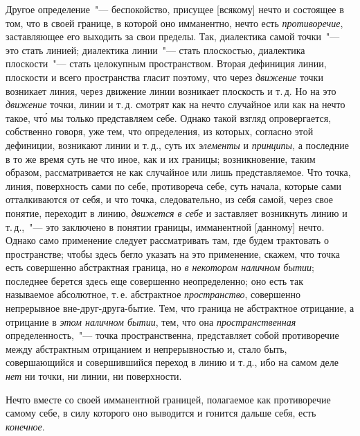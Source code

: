 Другое определение~"--- беспокойство, присущее [всякому]
нечто и состоящее в том, что в своей границе, в
которой оно имманентно, нечто есть \emph{противоречие}, заставляющее
его выходить за свои пределы. Так, диалектика
самой точки~"--- это стать линией; диалектика линии~"---
стать плоскостью, диалектика плоскости~"--- стать целокупным
пространством. Вторая дефиниция линии, плоскости
и всего пространства гласит поэтому, что через
\emph{движение} точки возникает линия, через движение линии
возникает плоскость и т.\,д. Но на это \emph{движение} точки,
линии и т.\,д. смотрят как на нечто случайное или как
на нечто такое, чт\'о мы только представляем себе. Однако
такой взгляд опровергается, собственно говоря, уже тем,
что определения, из которых, согласно этой дефиниции,
возникают линии и т.\,д., суть их \emph{элементы} и \emph{принципы},
а последние в то же время суть не что иное, как и их границы;
возникновение, таким образом, рассматривается
не как случайное или лишь представляемое. Что точка,
линия, поверхность сами по себе, противореча себе, суть
начала, которые сами отталкиваются от себя, и что точка,
следовательно, из себя самой, через свое понятие,
переходит в линию, \emph{движется в себе} и заставляет возникнуть
линию и т.\,д.,~"--- это заключено в понятии границы,
имманентной [данному] нечто. Однако само применение
следует рассматривать там, где будем трактовать
о пространстве; чтобы здесь бегло указать на это применение,
скажем, что точка есть совершенно абстрактная
граница, но \emph{в некотором наличном бытии}; последнее берется
здесь еще совершенно неопределенно; оно есть так
называемое абсолютное, т.\,е. абстрактное \emph{пространство},
совершенно непрерывное вне-друг-друга-бытие. Тем, что
граница не абстрактное отрицание, а отрицание в \emph{этом
наличном бытии}, тем, что она \emph{пространственная} определенность,~"---
точка пространственна, представляет собой
противоречие между абстрактным отрицанием и непрерывностью
и, стало быть, совершающийся и совершившийся
переход в линию и т.\,д., ибо на самом деле \emph{нет}
ни точки, ни линии, ни поверхности.

Нечто вместе со своей имманентной границей, полагаемое
как противоречие самому себе, в силу которого
оно выводится и гонится дальше себя, есть \emph{конечное}.


